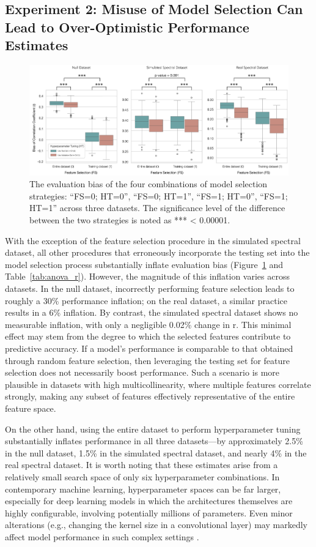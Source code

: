 \subsection{Experiment 2: Misuse of Model Selection Can Lead to Over-Optimistic Performance Estimates}

\begin{figure}[H]
    \centering
    \includegraphics[width=1\textwidth]{fig_7.jpg}
    \caption{The evaluation bias of the four combinations of model selection strategies: “FS=0; HT=0”, “FS=0; HT=1”, “FS=1; HT=0”, “FS=1; HT=1” across three datasets. The significance level of the difference between the two strategies is noted as *** < 0.00001.}
    \label{fig:s2_results}
\end{figure}

With the exception of the feature selection procedure in the simulated spectral dataset, all other procedures that erroneously incorporate the testing set into the model selection process substantially inflate evaluation bias (Figure~\ref{fig:s2_results} and Table~\ref{tab:anova_r}). However, the magnitude of this inflation varies across datasets. In the null dataset, incorrectly performing feature selection leads to roughly a 30\% performance inflation; on the real dataset, a similar practice results in a 6\% inflation. By contrast, the simulated spectral dataset shows no measurable inflation, with only a negligible 0.02\% change in r. This minimal effect may stem from the degree to which the selected features contribute to predictive accuracy. If a model’s performance is comparable to that obtained through random feature selection, then leveraging the testing set for feature selection does not necessarily boost performance. Such a scenario is more plausible in datasets with high multicollinearity, where multiple features correlate strongly, making any subset of features effectively representative of the entire feature space.

On the other hand, using the entire dataset to perform hyperparameter tuning substantially inflates performance in all three datasets—by approximately 2.5\% in the null dataset, 1.5\% in the simulated spectral dataset, and nearly 4\% in the real spectral dataset. It is worth noting that these estimates arise from a relatively small search space of only six hyperparameter combinations. In contemporary machine learning, hyperparameter spaces can be far larger, especially for deep learning models in which the architectures themselves are highly configurable, involving potentially millions of parameters. Even minor alterations (e.g., changing the kernel size in a convolutional layer) may markedly affect model performance in such complex settings \citep{zoph_neural_2017}.

